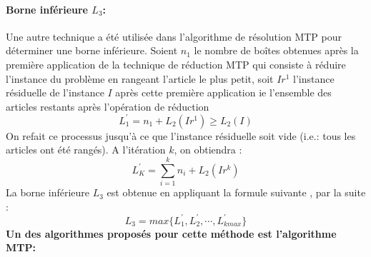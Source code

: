 \documentclass[class=report, crop=false]{standalone}
\begin{document}
    \paragraph{Borne inférieure  \(L_3\):}
    Une autre technique a été utilisée dans l’algorithme de résolution MTP pour déterminer une borne inférieure.
    Soient \(n_1\) le nombre de boîtes obtenues après la première application de la technique de réduction MTP qui consiste à réduire l’instance du problème en rangeant l’article le plus petit, soit \(Ir^1\) l’instance résiduelle de l’instance \(I\) après cette première application ie l’ensemble des articles restants après l’opération de réduction
    \[L^\prime_1=n_1+L_2(Ir^1) \ge L_2(I)\]
    On refait ce processus jusqu'à ce que l’instance résiduelle soit vide (i.e.: tous les articles ont été rangés). A l’itération \(k\), on obtiendra :
    \[L^\prime_K= \displaystyle\sum_{i=1}^{k} n_i + L_2(Ir^k)\] 
    La borne inférieure \(L_3\) est obtenue en appliquant la formule suivante , par la suite :
    \[L_3=max \{L^\prime_1, L^\prime_2,\cdots,L^\prime_{kmax}\}\]
    \textbf{Un des algorithmes proposés pour cette méthode est l’algorithme MTP:} 
\end{document}
